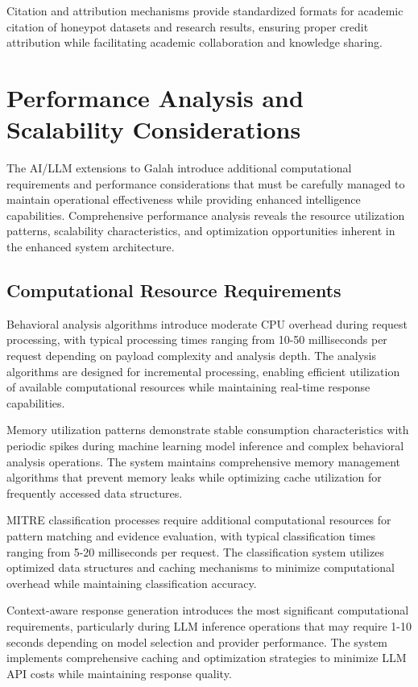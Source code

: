 Citation and attribution mechanisms provide standardized formats for academic citation of honeypot datasets and research results, ensuring proper credit attribution while facilitating academic collaboration and knowledge sharing.

\section{Performance Analysis and Scalability Considerations}

The AI/LLM extensions to Galah introduce additional computational requirements and performance considerations that must be carefully managed to maintain operational effectiveness while providing enhanced intelligence capabilities. Comprehensive performance analysis reveals the resource utilization patterns, scalability characteristics, and optimization opportunities inherent in the enhanced system architecture.

\subsection{Computational Resource Requirements}

Behavioral analysis algorithms introduce moderate CPU overhead during request processing, with typical processing times ranging from 10-50 milliseconds per request depending on payload complexity and analysis depth. The analysis algorithms are designed for incremental processing, enabling efficient utilization of available computational resources while maintaining real-time response capabilities.

Memory utilization patterns demonstrate stable consumption characteristics with periodic spikes during machine learning model inference and complex behavioral analysis operations. The system maintains comprehensive memory management algorithms that prevent memory leaks while optimizing cache utilization for frequently accessed data structures.

MITRE classification processes require additional computational resources for pattern matching and evidence evaluation, with typical classification times ranging from 5-20 milliseconds per request. The classification system utilizes optimized data structures and caching mechanisms to minimize computational overhead while maintaining classification accuracy.

Context-aware response generation introduces the most significant computational requirements, particularly during LLM inference operations that may require 1-10 seconds depending on model selection and provider performance. The system implements comprehensive caching and optimization strategies to minimize LLM API costs while maintaining response quality.

